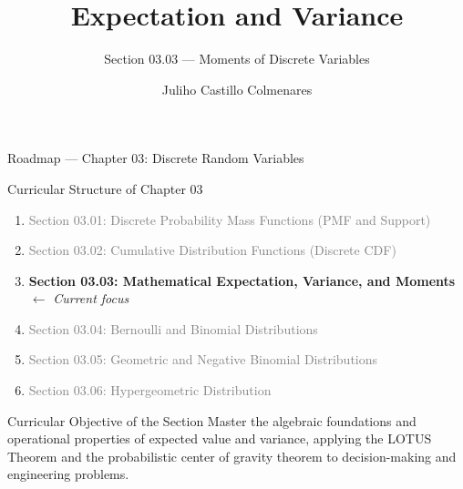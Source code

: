 \documentclass[aspectratio=169,xcolor={dvipsnames,table}]{beamer}
\title{Expectation and Variance}
\subtitle{Section 03.03 --- Moments of Discrete Variables}
\author[J. Castillo Colmenares]{Juliho Castillo Colmenares}
\institute[Tec de Monterrey]{Tecnológico de Monterrey}
\date{\vspace{-1.2cm}}
\begin{document}
\begin{frame}[plain]
	\titlepage
\end{frame}

\begin{frame}{Roadmap --- Chapter 03: Discrete Random Variables}
	\begin{block}{Curricular Structure of Chapter 03}
		\small
		\begin{enumerate}
			\itemsep=0.04cm
			\item \textcolor{gray}{Section 03.01: Discrete Probability Mass Functions (PMF and Support)}
			\item \textcolor{gray}{Section 03.02: Cumulative Distribution Functions (Discrete CDF)}
			\item \textbf{\textcolor{TecRojo}{Section 03.03: Mathematical Expectation, Variance, and Moments}} $\leftarrow$ \emph{Current focus}
			\item \textcolor{gray}{Section 03.04: Bernoulli and Binomial Distributions}
			\item \textcolor{gray}{Section 03.05: Geometric and Negative Binomial Distributions}
			\item \textcolor{gray}{Section 03.06: Hypergeometric Distribution}
		\end{enumerate}
	\end{block}
	\vspace{-0.15cm}
	\begin{alertblock}{Curricular Objective of the Section}
		\footnotesize
		Master the algebraic foundations and operational properties of expected value and variance, applying the LOTUS Theorem and the probabilistic center of gravity theorem to decision-making and engineering problems.
	\end{alertblock}
\end{frame}
\end{document}
